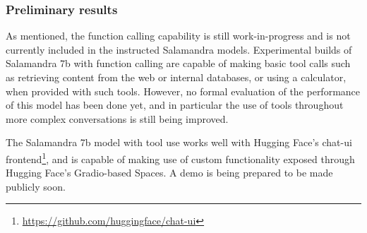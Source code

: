 \subsubsection{Preliminary results}
As mentioned, the function calling capability is still work-in-progress and is not currently included in the instructed Salamandra models. Experimental builds of Salamandra 7b with function calling are capable of making basic tool calls such as retrieving content from the web or internal databases, or using a calculator, when provided with such tools. However, no formal evaluation of the performance of this model has been done yet, and in particular the use of tools throughout more complex conversations is still being improved.

The Salamandra 7b model with tool use works well with Hugging Face's chat-ui frontend\footnote{\url{https://github.com/huggingface/chat-ui}}, and is capable of making use of custom functionality exposed through Hugging Face's Gradio-based Spaces. A demo is being prepared to be made publicly soon.